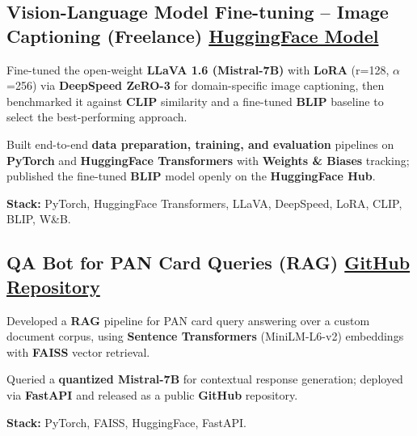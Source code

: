 \documentclass[letter,10pt]{article}
\begin{document}
\subsection{Vision-Language Model Fine-tuning – Image Captioning (Freelance) \hfill \href{https://huggingface.co/sunil448832/blip-model}{HuggingFace Model}}
\begin{zitemize}
\item Fine-tuned the open-weight \textbf{LLaVA 1.6 (Mistral-7B)} with \textbf{LoRA} (r=128, $\alpha$=256) via \textbf{DeepSpeed ZeRO-3} for domain-specific image captioning, then benchmarked it against \textbf{CLIP} similarity and a fine-tuned \textbf{BLIP} baseline to select the best-performing approach.
\item Built end-to-end \textbf{data preparation, training, and evaluation} pipelines on \textbf{PyTorch} and \textbf{HuggingFace Transformers} with \textbf{Weights \& Biases} tracking; published the fine-tuned \textbf{BLIP} model openly on the \textbf{HuggingFace Hub}.
\item \textbf{Stack:} PyTorch, HuggingFace Transformers, LLaVA, DeepSpeed, LoRA, CLIP, BLIP, W\&B.
\end{zitemize}

\subsection{QA Bot for PAN Card Queries (RAG) \hfill \href{https://github.com/sunil448832/Natural-Language-Processing/tree/master/RAG(Retrieval\%20Augment\%20Generation)}{GitHub Repository}}
\begin{zitemize}
\item Developed a \textbf{RAG} pipeline for PAN card query answering over a custom document corpus, using \textbf{Sentence Transformers} (MiniLM-L6-v2) embeddings with \textbf{FAISS} vector retrieval.
\item Queried a \textbf{quantized Mistral-7B} for contextual response generation; deployed via \textbf{FastAPI} and released as a public \textbf{GitHub} repository.
\item \textbf{Stack:} PyTorch, FAISS, HuggingFace, FastAPI.
\end{zitemize}
\end{document}
